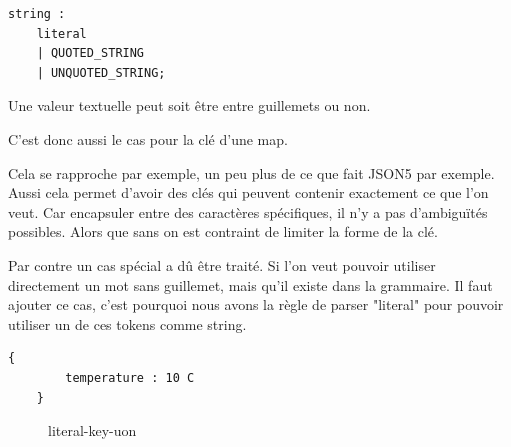 \documentclass[
    iict, %
    il, %
]{heig-tb}
\begin{document}
\begin{lstlisting}[frame=single,caption={uon-string},label={uon-string}]
    string :
	literal
	| QUOTED_STRING
	| UNQUOTED_STRING;
\end{lstlisting}

Une valeur textuelle peut soit être entre guillemets ou non.

C'est donc aussi le cas pour la clé d'une map.

Cela se rapproche par exemple, un peu plus de ce que fait JSON5 par exemple. %
Aussi cela permet d'avoir des clés qui peuvent contenir exactement ce que l'on veut.
Car encapsuler entre des caractères spécifiques, il n'y a pas d'ambiguïtés possibles. Alors que sans on est contraint de limiter la forme de la clé.

Par contre un cas spécial a dû être traité. Si l'on veut pouvoir utiliser directement un mot sans guillemet, mais qu'il existe dans la grammaire.
Il faut ajouter ce cas, c'est pourquoi nous avons la règle de parser "literal" pour pouvoir utiliser un de ces tokens comme string.

\begin{lstlisting}[frame=single]
    {
        temperature : 10 C
    }
\end{lstlisting}

\begin{figure}[!h]
    \begin{center}
    \end{center}
    \caption[literal-key-uon]{\label{literal-key-uon}literal-key-uon}
\end{figure}
\end{document}
